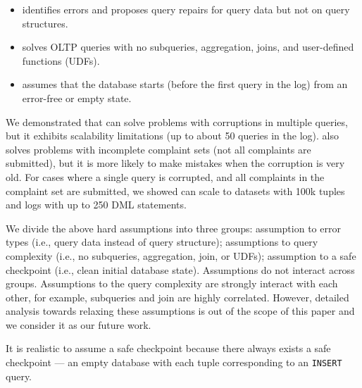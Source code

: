 \begin{itemize}
\item \sys identifies errors and proposes query repairs for query data but not on query structures.
\item \sys solves OLTP queries with no subqueries, aggregation, joins, and user-defined functions (UDFs).
\item \sys assumes that the database starts (before the first query in the log) from an error-free or empty state. 
\end{itemize}

We demonstrated that \sys can solve problems with corruptions in multiple queries, but it exhibits scalability limitations (up to about 50 queries in the log).  \sys also solves problems with incomplete
complaint sets (not all complaints are submitted), but it is more likely to make mistakes when the corruption is very old.  
For cases where a single query is corrupted, and all complaints in the complaint set are submitted, we showed \sys can scale to datasets with 100k tuples and logs with up to 250 DML statements.

\begin{quote}
\end{quote}

We divide the above hard assumptions into three groups: assumption to error types (i.e., query data instead of query structure);
assumptions to query complexity (i.e., no subqueries, aggregation, join, or UDFs); assumption to 
a safe checkpoint (i.e., clean initial database state). Assumptions do not interact across groups. 
Assumptions to the query complexity are strongly interact with each other, for example, subqueries and join 
are highly correlated. However, detailed analysis towards relaxing these assumptions is out of the scope of this paper and 
we consider it as our future work. 


\begin{quote}
\end{quote}
It is realistic to assume a safe checkpoint because there always exists a safe checkpoint ---
an empty database with each tuple corresponding to an \texttt{INSERT} query. 

\begin{quote}
\end{quote}

